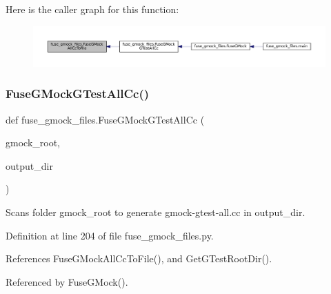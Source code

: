 Here is the caller graph for this function\+:
\nopagebreak
\begin{figure}[H]
\begin{center}
\leavevmode
\includegraphics[width=350pt]{namespacefuse__gmock__files_af470a39a4df492b1ca0d9493eac8222b_icgraph}
\end{center}
\end{figure}
\mbox{\label{namespacefuse__gmock__files_a50eb499fcb075e19191e8403bd85c813}} 
\subsubsection{\texorpdfstring{Fuse\+G\+Mock\+G\+Test\+All\+Cc()}{FuseGMockGTestAllCc()}}
{\footnotesize\ttfamily def fuse\+\_\+gmock\+\_\+files.\+Fuse\+G\+Mock\+G\+Test\+All\+Cc (\begin{DoxyParamCaption}\item[{}]{gmock\+\_\+root,  }\item[{}]{output\+\_\+dir }\end{DoxyParamCaption})}

\begin{DoxyVerb}Scans folder gmock_root to generate gmock-gtest-all.cc in output_dir.\end{DoxyVerb}
 

Definition at line 204 of file fuse\+\_\+gmock\+\_\+files.\+py.



References Fuse\+G\+Mock\+All\+Cc\+To\+File(), and Get\+G\+Test\+Root\+Dir().



Referenced by Fuse\+G\+Mock().


